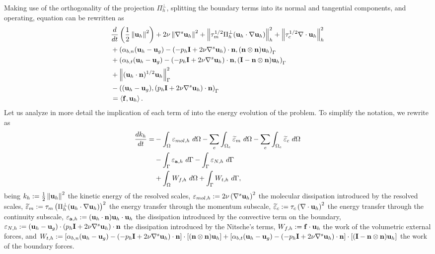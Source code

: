 Making use of the orthogonality of the projection $ \Pi_h^\perp $, splitting the boundary terms into its normal and tangential components, and operating, equation  can be rewritten as
\begin{align}
\label{eq-C7_NS_ene_balance_2}
&\frac{d}{dt}\left(\frac{1}{2}\left\|{\bf u}_h\right\|^2\right)+2\nu\left\|\nabla^s{\bf u}_h\right\|^2+\left\|\tau_m^{1/2}\Pi_h^\perp({\bf u}_h\cdot\nabla{\bf u}_h)\right\|^2_h+\left\|\tau_c^{1/2}\nabla\cdot{\bf u}_h\right\|^2_h\\\nonumber
&+\left(\alpha_{b,n}({\bf u}_h-{\bf u}_g)-(-p_h\mathbf{I}+2\nu\nabla^s{\bf u}_h)\cdot{\bf n},({\bf n}\otimes{\bf n}){\bf u}_h\right)_\Gamma\\\nonumber
&+\left(\alpha_{b,t}({\bf u}_h-{\bf u}_g)-(-p_h\mathbf{I}+2\nu\nabla^s{\bf u}_h)\cdot{\bf n},(\mathbf{I}-{\bf n}\otimes{\bf n}){\bf u}_h\right)_\Gamma\\\nonumber
&+\left\|({\bf u}_h\cdot{\bf n})^{1/2}{\bf u}_h\right\|^2_\Gamma\\\nonumber
&-\left(({\bf u}_h-{\bf u}_g),(p_h\mathbf{I}+2\nu\nabla^s{\bf u}_h)\cdot{\bf n}\right)_\Gamma\\\nonumber
&=\left\langle{\bf f},{\bf u}_h\right\rangle.
\end{align}
Let us analyze in more detail the implication of each term of  into the energy evolution of the problem. To simplify the notation, we rewrite  as
\begin{align}
\label{eq-C7_NS_ene_balance_3}
\frac{dk_h}{dt}=&-\int_{\Omega}\varepsilon_{mol,h}\ d\Omega-\sum_e\int_{\Omega_e}\widetilde{\varepsilon}_m\ d\Omega-\sum_e\int_{\Omega_e}\widetilde{\varepsilon}_c\ d\Omega\\\nonumber
&-\int_{\Gamma}\varepsilon_{\a,h}\ d\Gamma-\int_{\Gamma}\varepsilon_{N,h}\ d\Gamma\\\nonumber
&+\int_{\Omega}W_{f,h}\ d\Omega+\int_{\Gamma}W_{t,h}\ d\Gamma,
\end{align}
being $ k_h:=\frac{1}{2}\left\|{\bf u}_h\right\|^2 $ the kinetic energy of the resolved scales, $ \varepsilon_{mol,h}:=2\nu\left(\nabla^s{\bf u}_h\right)^2 $ the molecular dissipation introduced by the resolved scales, $ \widetilde{\varepsilon}_m:=\tau_m\left(\Pi_h^\perp({\bf u}_h\cdot\nabla{\bf u}_h)\right)^2 $ the energy transfer through the momentum subscale, $ \widetilde{\varepsilon}_c:=\tau_c\left(\nabla\cdot{\bf u}_h\right)^2 $ the energy transfer through the continuity subscale, $ \varepsilon_{{\bf a},h}:=({\bf u}_h\cdot{\bf n}){\bf u}_h\cdot{\bf u}_h $ the dissipation introduced by the convective term on the boundary, $ \varepsilon_{N,h}:=({\bf u}_h-{\bf u}_g)\cdot(p_h\mathbf{I}+2\nu\nabla^s{\bf u}_h)\cdot{\bf n} $ the dissipation introduced by the Nitsche's terms, $ W_{f,h}:={\bf f}\cdot{\bf u}_h $ the work of the volumetric external forces, and $ W_{t,h}:=\left[\alpha_{b,n}({\bf u}_h-{\bf u}_g)-(-p_h\mathbf{I}+2\nu\nabla^s{\bf u}_h)\cdot{\bf n}\right]\cdot\left[({\bf n}\otimes{\bf n}){\bf u}_h\right]+\left[\alpha_{b,t}({\bf u}_h-{\bf u}_g)-(-p_h\mathbf{I}+2\nu\nabla^s{\bf u}_h)\cdot{\bf n}\right]\cdot\left[(\mathbf{I}-{\bf n}\otimes{\bf n}){\bf u}_h\right] $ the work of the boundary forces.

